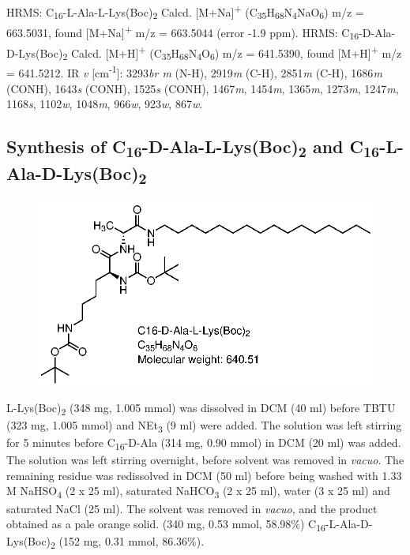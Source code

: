 \newline
HRMS: C\textsubscript{16}-L-Ala-L-Lys(Boc)\textsubscript{2} Calcd. [M+Na]\textsuperscript{+} (C\textsubscript{35}H\textsubscript{68}N\textsubscript{4}NaO\textsubscript{6}) m/z = 663.5031, found [M+Na]\textsuperscript{+} m/z = 663.5044 (error -1.9 ppm).
HRMS: C\textsubscript{16}-D-Ala-D-Lys(Boc)\textsubscript{2} Calcd. [M+H]\textsuperscript{+} (C\textsubscript{35}H\textsubscript{68}N\textsubscript{4}O\textsubscript{6}) m/z = 641.5390, found [M+H]\textsuperscript{+} m/z = 641.5212.
\newline
IR \textit{v} [cm\textsuperscript{-1}]: 3293\textit{br m} (N-H), 2919\textit{m} (C-H), 2851\textit{m} (C-H), 1686\textit{m} (CONH), 1643\textit{s} (CONH), 1525\textit{s} (CONH), 1467\textit{m}, 1454\textit{m}, 1365\textit{m}, 1273\textit{m}, 1247\textit{m}, 1168\textit{s}, 1102\textit{w}, 1048\textit{m}, 966\textit{w}, 923\textit{w}, 867\textit{w}.  
\newline

\subsection*{Synthesis of C\textsubscript{16}-D-Ala-L-Lys(Boc)\textsubscript{2} and C\textsubscript{16}-L-Ala-D-Lys(Boc)\textsubscript{2}}
\begin{figure}[h!]
\centering
\includegraphics{Figures/C16-D-Ala-L-Lys_boc_2.eps}
\end{figure}
L-Lys(Boc)\textsubscript{2} (348 mg, 1.005 mmol) was dissolved in DCM (40 ml) before TBTU (323 mg, 1.005 mmol) and NEt\textsubscript{3} (9 ml) were added. The solution was left stirring for 5 minutes before C\textsubscript{16}-D-Ala (314 mg, 0.90 mmol)  in DCM (20 ml) was added. The solution was left stirring overnight, before solvent was removed in \textit{vacuo}.
\newline
The  remaining residue was redissolved in DCM (50 ml) before being washed with 1.33 M NaHSO\textsubscript{4} (2 x 25 ml), saturated NaHCO\textsubscript{3} (2 x 25 ml), water (3 x 25 ml) and saturated NaCl (25 ml). The solvent was removed in \textit{vacuo}, and the product obtained as a pale orange solid. (340 mg, 0.53 mmol, 58.98\%)  C\textsubscript{16}-L-Ala-D-Lys(Boc)\textsubscript{2} (152 mg, 0.31 mmol, 86.36\%). 

